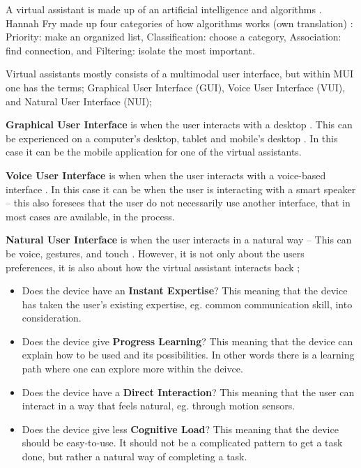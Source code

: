 A virtual assistant is made up of an artificial intelligence and algorithms \cite{Fry.H}. Hannah Fry \cite{Fry.H} made up four categories of how algorithms works (own translation) : Priority: make an organized list, Classification: choose a category, Association: find connection, and Filtering: isolate the most important. 


Virtual assistants mostly consists of a multimodal user interface, but within MUI one has the terms; Graphical User Interface (GUI), Voice User Interface (VUI), and  Natural User Interface (NUI);

\textbf{Graphical User Interface} is when the user interacts with a desktop \cite{Interaction-Design-Foundation-GUI}. This can be experienced on a computer's desktop, tablet and mobile's desktop \cite{Interaction-Design-Foundation-GUI}. In this case it can be the mobile application for one of the virtual assistants. 
 
\textbf{Voice User Interface} is when when the user interacts with a voice-based interface \cite{Interaction-Design-Foundation-VUI}. In this case it can be when the user is interacting with a smart speaker – this also foresees that the user do not necessarily use another interface, that in most cases are available, in the process.  
 
\textbf{Natural User Interface} is when the user interacts in a natural way – This can be voice, gestures, and touch \cite{Interaction-Design-Foundation-NUI}. However, it is not only about the users preferences, it is also about how the virtual assistant interacts back \cite{Interaction-Design-Foundation-NUI}; 
 \begin{itemize}
     \item Does the device have an \textbf{Instant Expertise}? This meaning that the device has taken the user's existing expertise, eg. common communication skill, into consideration. 
     \item Does the device give \textbf{Progress Learning}? This meaning that the device can explain how to be used and its possibilities. In other words there is a learning path where one can explore more within the deivce. 
     \item Does the device have a \textbf{Direct Interaction}? This meaning that the user can interact in a way that feels natural, eg. through motion sensors.
     \item Does the device give less \textbf{Cognitive Load}? This meaning that the device should be easy-to-use. It should not be a complicated pattern to get a task done, but rather a natural way of completing a task. 
 \end{itemize}

